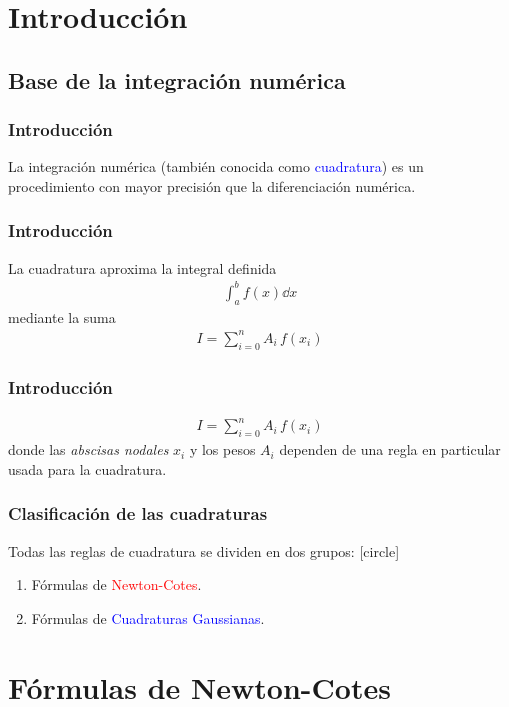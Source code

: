 \section{Introducción}
\subsection{Base de la integración numérica}
\begin{frame}
\frametitle{Introducción}
La integración numérica (también conocida como \textcolor{blue}{cuadratura}) es un procedimiento con mayor precisión que la diferenciación numérica.
\end{frame}
\begin{frame}
\frametitle{Introducción}
La cuadratura aproxima la integral definida
\begin{align*}
\int_{a}^{b} f(x) \dd{x}
\end{align*}
mediante la suma
\begin{align*}
I = \sum_{i=0}^{n} A_{i} \, f(x_{i})
\end{align*}
\end{frame}
\begin{frame}
\frametitle{Introducción}
\begin{align*}
I = \sum_{i=0}^{n} A_{i} \, f(x_{i})
\end{align*}
donde las \textit{abscisas nodales} $x_{i}$ y los pesos $A_{i}$ dependen de una regla en particular usada para la cuadratura.
\end{frame}
\begin{frame}
\frametitle{Clasificación de las cuadraturas}
Todas las reglas de cuadratura se dividen en dos grupos:
[circle]
\begin{enumerate}[<+->]
\item Fórmulas de \textcolor{red}{Newton-Cotes}.
\item Fórmulas de \textcolor{blue}{Cuadraturas Gaussianas}.
\end{enumerate}
\end{frame}
\section{Fórmulas de Newton-Cotes}
